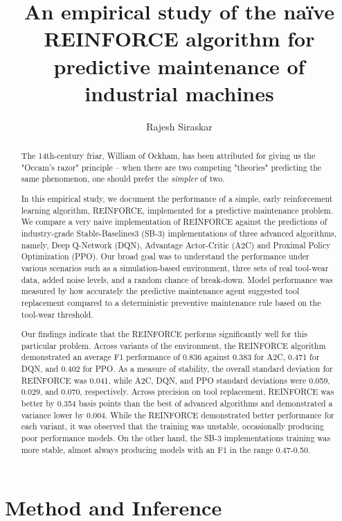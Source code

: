 \documentclass[]{article}
\title{An empirical study of the na\"ive REINFORCE algorithm for predictive maintenance of industrial machines}
\author{Rajesh Siraskar}
\begin{document}
\maketitle

\begin{abstract}
The 14th-century friar, William of Ockham, has been attributed for giving us the "Occam's razor" principle -- when there are two competing "theories" predicting the same phenomenon, one should prefer the \textit{simpler} of two.

In this empirical study, we document the performance of a simple, early reinforcement learning algorithm, REINFORCE, implemented for a predictive maintenance problem. We compare a very naive implementation of REINFORCE against the predictions of industry-grade Stable-Baselines3 (SB-3) implementations of three advanced algorithms, namely, Deep Q-Network (DQN), Advantage Actor-Critic (A2C) and Proximal Policy Optimization (PPO). Our broad goal was to understand the performance under various scenarios such as a simulation-based environment, three sets of real tool-wear data, added noise levels, and a random chance of break-down. Model performance was measured by how accurately the predictive maintenance agent suggested tool replacement compared to a deterministic preventive maintenance rule based on the tool-wear threshold. 

Our findings indicate that the REINFORCE performs significantly well for this particular problem. Across variants of the environment, the REINFORCE algorithm demonstrated an average F1 performance of 0.836 against 0.383 for A2C, 0.471 for DQN, and 0.402 for PPO. As a measure of stability, the overall standard deviation for REINFORCE was 0.041, while A2C, DQN, and PPO standard deviations were 0.059, 0.029, and 0.070, respectively. Across precision on tool replacement, REINFORCE was better by 0.354 basis points than the best of advanced algorithms and demonstrated a variance lower by 0.004. While the REINFORCE demonstrated better performance for each variant, it was observed that the training was unstable, occasionally producing poor performance models. On the other hand, the SB-3 implementations training was more stable, almost always producing models with an F1 in the range 0.47-0.50.


\end{abstract}


\section{Method and Inference}
\end{document}
